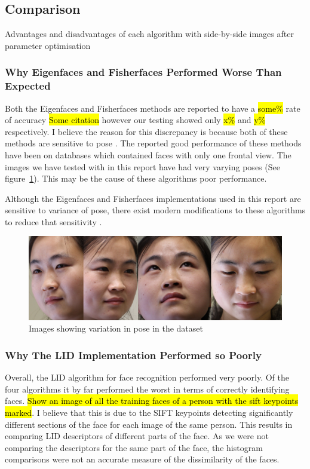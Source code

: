 \documentclass{article}
\begin{document}
\subsection{Comparison}
Advantages and disadvantages of each algorithm with side-by-side images after parameter optimisation

\subsubsection{Why Eigenfaces and Fisherfaces Performed Worse Than Expected}
Both the Eigenfaces and Fisherfaces methods are reported to have a \hl{some\%} rate of accuracy \hl{Some citation} however our testing showed only \hl{x\%} and \hl{y\%} respectively. I believe the reason for this discrepancy is because both of these methods are sensitive to pose \cite{turk1991eigenfaces}\cite{belhumeur1997eigenfaces}. The reported good performance of these methods have been on databases which contained faces with only one frontal view. The images we have tested with in this report have had very varying poses (See figure~\ref{fig:pose}). This may be the cause of these algorithms poor performance.

Although the Eigenfaces and Fisherfaces implementations used in this report are sensitive to variance of pose, there exist modern modifications to these algorithms to reduce that sensitivity \cite{jaiswal2012local}.
\begin{figure}[H]
\centering
\includegraphics[width=0.7\linewidth]{./pose}
\caption{Images showing variation in pose in the dataset}
\label{fig:pose}
\end{figure} %

\subsubsection{Why The LID Implementation Performed so Poorly}
Overall, the LID algorithm for face recognition performed very poorly. Of the four algorithms it by far performed the worst in terms of correctly identifying faces. \hl{Show an image of all the training faces of a person with the sift keypoints marked}. I believe that this is due to the SIFT keypoints detecting significantly different sections of the face for each image of the same person. This results in comparing LID descriptors of different parts of the face. As we were not comparing the descriptors for the same part of the face, the histogram comparisons were not an accurate measure of the dissimilarity of the faces.
\end{document}
